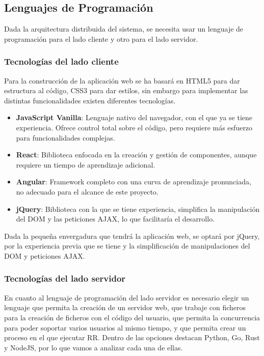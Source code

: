 \subsection{Lenguajes de Programación} \label{sec:programacion}

Dada la arquitectura distribuida del sistema, se necesita usar un lenguaje de programación para el lado cliente y otro para el lado servidor.

\subsubsection{Tecnologías del lado cliente} \label{sec:tecnologias-cliente}

Para la construcción de la aplicación web se ha basará en HTML5 para dar estructura al código, CSS3 para dar estilos, sin embargo para implementar las distintas funcionalidades existen diferentes tecnologías.

\begin{itemize}
    \item \textbf{JavaScript Vanilla}: Lenguaje nativo del navegador, con el que ya se tiene experiencia. Ofrece control total sobre el código, pero requiere más esfuerzo para funcionalidades complejas.
    \item \textbf{React}: Biblioteca enfocada en la creación y gestión de componentes, aunque requiere un tiempo de aprendizaje adicional.
    \item \textbf{Angular}: Framework completo con una curva de aprendizaje pronunciada, no adecuado para el alcance de este proyecto.
    \item \textbf{jQuery}: Biblioteca con la que se tiene experiencia, simplifica la manipulación del DOM y las peticiones AJAX, lo que facilitaría el desarrollo.
\end{itemize}

Dada la pequeña envergadura que tendrá la aplicación web, se optará por jQuery, por la experiencia previa que se tiene y la simplificación de manipulaciones del DOM y peticiones AJAX.

\subsubsection{Tecnologías del lado servidor} \label{sec:tecnologias-servidor}

En cuanto al lenguaje de programación del lado servidor es necesario elegir un lenguaje que permita la creación de un servidor web, que trabaje con ficheros para la creación de ficheros con el código del usuario, que permita la concurrencia para poder soportar varios usuarios al mismo tiempo, y que permita crear un proceso en el que ejecutar RR.
Dentro de las opciones destacan Python, Go, Rust y NodeJS, por lo que vamos a analizar cada una de ellas.

